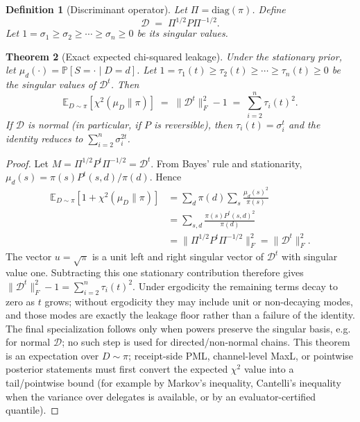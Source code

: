 \documentclass[11pt]{article}
\newtheorem{theorem}{Theorem}[section]
\newtheorem{definition}[theorem]{Definition}
\newcommand{\E}{\mathbb{E}}
\newcommand{\Prb}{\mathbb{P}}
\newcommand{\cD}{\mathcal{D}}
\newcommand{\PiM}{\Pi}
\begin{document}
\begin{definition}[Discriminant operator]\label{def:disc}
Let $\PiM=\mathrm{diag}(\pi)$. Define
\[
\cD \;=\; \PiM^{1/2} P \PiM^{-1/2}.
\]
Let $1=\sigma_1\ge\sigma_2\ge\cdots\ge\sigma_n\ge 0$ be its singular values.
\end{definition}

\begin{theorem}[Exact expected chi-squared leakage]\label{thm:chi2-exact}
Under the stationary prior, let $\mu_d(\cdot)=\Prb[S=\cdot\mid D=d]$.  Let
$1=\tau_1(t)\ge\tau_2(t)\ge\cdots\ge\tau_n(t)\ge 0$ be the singular values of
$\cD^t$. Then
\[
\E_{D\sim \pi}\!\left[\chi^2(\mu_D\|\pi)\right] \;=\;
\|\cD^t\|_F^2-1
\;=\;
\sum_{i=2}^n \tau_i(t)^2.
\]
If $\cD$ is normal (in particular, if $P$ is reversible), then
$\tau_i(t)=\sigma_i^t$ and the identity reduces to
$\sum_{i=2}^n\sigma_i^{2t}$.
\end{theorem}
\begin{proof}
Let $M=\PiM^{1/2}P^t\PiM^{-1/2}=\cD^t$.  From Bayes' rule and stationarity,
$\mu_d(s)=\pi(s)P^t(s,d)/\pi(d)$.  Hence
\[
\begin{aligned}
\E_{D\sim\pi}\!\left[1+\chi^2(\mu_D\|\pi)\right]
&=\sum_d\pi(d)\sum_s\frac{\mu_d(s)^2}{\pi(s)} \\
&=\sum_{s,d}\frac{\pi(s)P^t(s,d)^2}{\pi(d)} \\
&=\|\PiM^{1/2}P^t\PiM^{-1/2}\|_F^2
=\|\cD^t\|_F^2.
\end{aligned}
\]
The vector $u=\sqrt{\pi}$ is a unit left and right singular vector of
$\cD^t$ with singular value one.  Subtracting this one stationary contribution
therefore gives $\|\cD^t\|_F^2-1=\sum_{i=2}^n\tau_i(t)^2$.  Under ergodicity the
remaining terms decay to zero as $t$ grows; without ergodicity they may include
unit or non-decaying modes, and those modes are exactly the leakage floor rather
than a failure of the identity.  The final specialization follows only when
powers preserve the singular basis, e.g. for normal $\cD$; no such step is used
for directed/non-normal chains.  This theorem is an expectation over $D\sim\pi$;
receipt-side PML, channel-level MaxL, or pointwise posterior statements must
first convert the expected $\chi^2$ value into a tail/pointwise bound (for
example by Markov's inequality, Cantelli's inequality when the variance over
delegates is available, or by an evaluator-certified quantile).
\end{proof}
\end{document}
